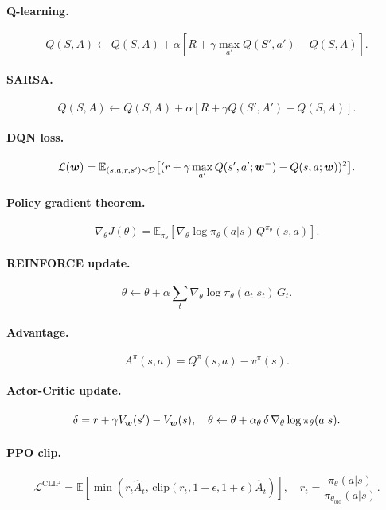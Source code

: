 \paragraph{Q-learning.}
\[
Q(S,A) \leftarrow Q(S,A) + \alpha\!\left[R + \gamma \max_{a'} Q(S', a') - Q(S, A)\right].
\]

\paragraph{SARSA.}
\[
Q(S,A) \leftarrow Q(S,A) + \alpha[R + \gamma Q(S', A') - Q(S, A)].
\]

\paragraph{DQN loss.}
\[
\mathcal{L}(\bm{w}) = \mathbb{E}_{(s,a,r,s')\sim \mathcal{D}}\big[(r + \gamma \max_{a'} Q(s', a'; \bm{w}^-) - Q(s, a; \bm{w}))^2\big].
\]

\paragraph{Policy gradient theorem.}
\[
\nabla_\theta J(\theta) = \mathbb{E}_{\pi_\theta}\!\left[\nabla_\theta \log \pi_\theta(a|s)\, Q^{\pi_\theta}(s,a)\right].
\]

\paragraph{REINFORCE update.}
\[
\theta \leftarrow \theta + \alpha \sum_t \nabla_\theta \log \pi_\theta(a_t|s_t)\, G_t.
\]

\paragraph{Advantage.}
\[
A^\pi(s,a) = Q^\pi(s,a) - v^\pi(s).
\]

\paragraph{Actor-Critic update.}
\[
\delta = r + \gamma V_{\bm{w}}(s') - V_{\bm{w}}(s),\quad \theta \leftarrow \theta + \alpha_\theta\,\delta\,\nabla_\theta\log\pi_\theta(a|s).
\]

\paragraph{PPO clip.}
\[
\mathcal{L}^{\text{CLIP}} = \mathbb{E}\!\left[\min(r_t \hat A_t,\, \mathrm{clip}(r_t, 1-\epsilon, 1+\epsilon)\hat A_t)\right], \quad r_t = \frac{\pi_\theta(a|s)}{\pi_{\theta_{\text{old}}}(a|s)}.
\]
